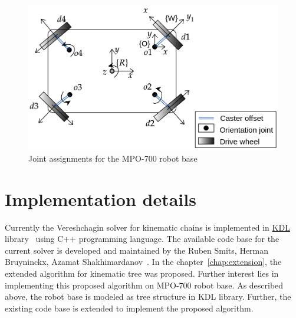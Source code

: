 \begin{figure}[h!]
	\begin{center}
		\includegraphics[scale=0.4]{images/conventions}
	\end{center}	
	\caption{Joint assignments for the MPO-700 robot base}
	\label{fig:conventions}
\end{figure}

\newpage
\section{Implementation details}
Currently the Vereshchagin solver for kinematic chains is implemented in \hyperref[kdl]{KDL} library~\cite{KDLopensource} using C++ programming language. The available code base for the current solver is developed and maintained by the Ruben Smits, Herman Bruyninckx, Azamat Shakhimardanov~\cite{KDLopensource}. In the chapter~\ref{chap:extension}, the extended algorithm for kinematic tree was proposed.  Further interest lies in implementing this proposed algorithm on MPO-700 robot base. As described above, the robot base is modeled as tree structure in KDL library. Further, the existing code base is extended to implement the proposed algorithm. 

%




